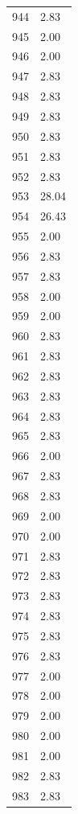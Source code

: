 \documentclass[a4paper,11pt]{article}
\begin{document}
\begin{center}
\begin{longtable}{|R{1.5cm}|R{2.5cm}|}
  944  &         2.83 \\ 
  945  &         2.00 \\ 
  946  &         2.00 \\ 
  947  &         2.83 \\ 
  948  &         2.83 \\ 
  949  &         2.83 \\ 
  950  &         2.83 \\ 
  951  &         2.83 \\ 
  952  &         2.83 \\ 
  953  &        28.04 \\ 
  954  &        26.43 \\ 
  955  &         2.00 \\ 
  956  &         2.83 \\ 
  957  &         2.83 \\ 
  958  &         2.00 \\ 
  959  &         2.00 \\ 
  960  &         2.83 \\ 
  961  &         2.83 \\ 
  962  &         2.83 \\ 
  963  &         2.83 \\ 
  964  &         2.83 \\ 
  965  &         2.83 \\ 
  966  &         2.00 \\ 
  967  &         2.83 \\ 
  968  &         2.83 \\ 
  969  &         2.00 \\ 
  970  &         2.00 \\ 
  971  &         2.83 \\ 
  972  &         2.83 \\ 
  973  &         2.83 \\ 
  974  &         2.83 \\ 
  975  &         2.83 \\ 
  976  &         2.83 \\ 
  977  &         2.00 \\ 
  978  &         2.00 \\ 
  979  &         2.00 \\ 
  980  &         2.00 \\ 
  981  &         2.00 \\ 
  982  &         2.83 \\ 
  983  &         2.83 \\ 

\end{longtable}
\end{center}
\end{document}
